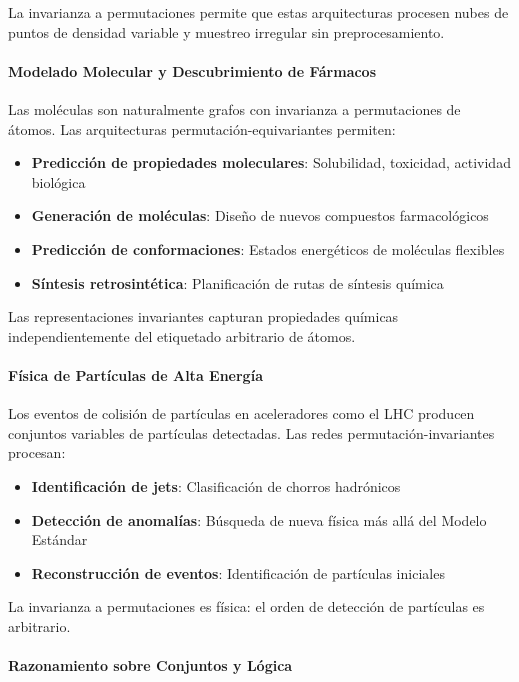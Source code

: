 La invarianza a permutaciones permite que estas arquitecturas procesen nubes de puntos de densidad variable y muestreo irregular sin preprocesamiento.

\paragraph{Modelado Molecular y Descubrimiento de Fármacos}

Las moléculas son naturalmente grafos con invarianza a permutaciones de átomos. Las arquitecturas permutación-equivariantes permiten:

\begin{itemize}
    \item \textbf{Predicción de propiedades moleculares}: Solubilidad, toxicidad, actividad biológica
    \item \textbf{Generación de moléculas}: Diseño de nuevos compuestos farmacológicos
    \item \textbf{Predicción de conformaciones}: Estados energéticos de moléculas flexibles
    \item \textbf{Síntesis retrosintética}: Planificación de rutas de síntesis química
\end{itemize}

Las representaciones invariantes capturan propiedades químicas independientemente del etiquetado arbitrario de átomos.

\paragraph{Física de Partículas de Alta Energía}

Los eventos de colisión de partículas en aceleradores como el LHC producen conjuntos variables de partículas detectadas. Las redes permutación-invariantes procesan:

\begin{itemize}
    \item \textbf{Identificación de jets}: Clasificación de chorros hadrónicos
    \item \textbf{Detección de anomalías}: Búsqueda de nueva física más allá del Modelo Estándar
    \item \textbf{Reconstrucción de eventos}: Identificación de partículas iniciales
\end{itemize}

La invarianza a permutaciones es física: el orden de detección de partículas es arbitrario.

\paragraph{Razonamiento sobre Conjuntos y Lógica}


